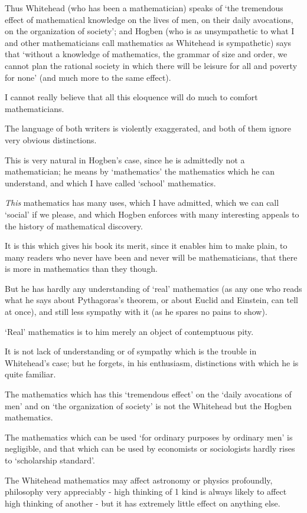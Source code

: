 \documentclass{article}
\numberwithin{equation}{section}
\begin{document}
Thus Whitehead (who has been a mathematician) speaks of `the tremendous effect of mathematical knowledge on the lives of men, on their daily avocations, on the organization of society'; and Hogben (who is as unsympathetic to what I and other mathematicians call mathematics as Whitehead is sympathetic) says that `without a knowledge of mathematics, the grammar of size and order, we cannot plan the rational society in which there will be leisure for all and poverty for none' (and much more to the same effect).

%
I cannot really believe that all this eloquence will do much to comfort mathematicians.

The language of both writers is violently exaggerated, and both of them ignore very obvious distinctions.

This is very natural in Hogben's case, since he is admittedly not a mathematician; he means by `mathematics' the mathematics which he can understand, and which I have called `school' mathematics.

\textit{This} mathematics has many uses, which I have admitted, which we can call `social' if we please, and which Hogben enforces with many interesting appeals to the history of mathematical discovery.

It is this which gives his book its merit, since it enables him to make plain, to many readers who never have been and never will be mathematicians, that there is more in mathematics than they though.

But he has hardly any understanding of `real' mathematics (as any one who reads what he says about Pythagoras's theorem, or about Euclid and Einstein, can tell at once), and still less sympathy with it (as he spares no pains to show).

`Real' mathematics is to him merely an object of contemptuous pity.

%
It is not lack of understanding or of sympathy which is the trouble in Whitehead's case; but he forgets, in his enthusiasm, distinctions with which he is quite familiar.

The mathematics which has this `tremendous effect' on the `daily avocations of men' and on `the organization of society' is not the Whitehead but the Hogben mathematics.

The mathematics which can be used `for ordinary purposes by ordinary men' is negligible, and that which can be used by economists or sociologists hardly rises to `scholarship standard'.

The Whitehead mathematics may affect astronomy or physics profoundly, philosophy very appreciably - high thinking of 1 kind is always likely to affect high thinking of another - but it has extremely little effect on anything else.
\end{document}
